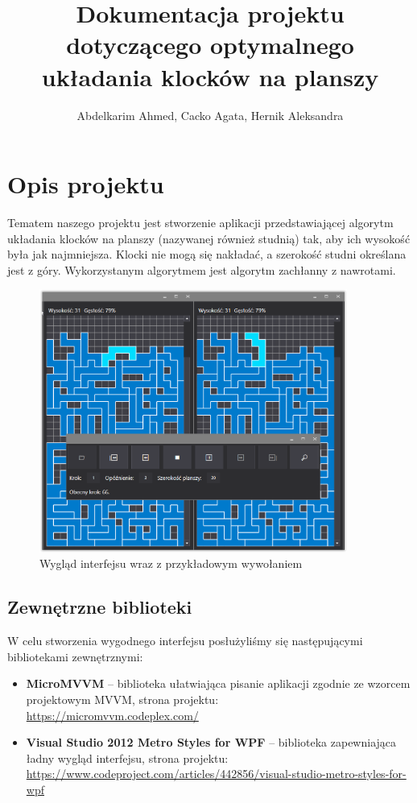 \documentclass{article}
\title{Dokumentacja projektu dotyczącego optymalnego układania klocków na planszy}
\author{Abdelkarim Ahmed, Cacko Agata, Hernik Aleksandra}
\begin{document}
\maketitle
\section{Opis projektu}
Tematem naszego projektu jest stworzenie aplikacji przedstawiającej algorytm układania klocków na planszy (nazywanej również studnią) tak, aby ich wysokość była jak najmniejsza. Klocki nie mogą się nakładać, a szerokość studni określana jest z góry. Wykorzystanym algorytmem jest algorytm zachłanny z nawrotami.



\begin{figure}[H]
\begin{center}
\includegraphics[width=0.9\textwidth]{interfejs.png}
\end{center}
\vspace{-0.3cm}
\caption{Wygląd interfejsu wraz z przykładowym wywołaniem}
\end{figure}



\subsection{Zewnętrzne biblioteki}

W celu stworzenia wygodnego interfejsu posłużyliśmy się następującymi bibliotekami zewnętrznymi:


\begin{itemize}
\item \textbf{MicroMVVM} -- biblioteka ułatwiająca pisanie aplikacji zgodnie ze wzorcem projektowym MVVM, strona projektu: \\ \url{https://micromvvm.codeplex.com/}
\item \textbf{Visual Studio 2012 Metro Styles for WPF} -- biblioteka zapewniająca ładny wygląd interfejsu, strona projektu: \url{https://www.codeproject.com/articles/442856/visual-studio-metro-styles-for-wpf}
\end{itemize}
\end{document}
